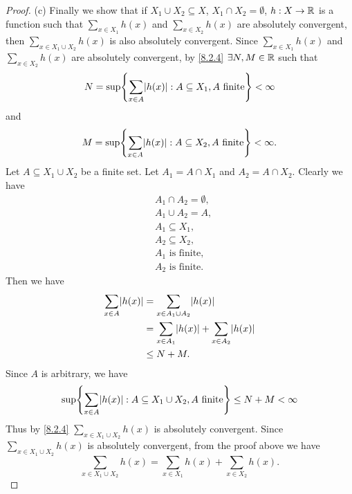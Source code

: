 \begin{proof}{(c)}
  Finally we show that if \(X_1 \cup X_2 \subseteq X\), \(X_1 \cap X_2 = \emptyset\), \(h : X \to \mathbb{R}\) is a function such that \(\sum_{x \in X_1} h(x)\) and \(\sum_{x \in X_2} h(x)\) are absolutely convergent, then \(\sum_{x \in X_1 \cup X_2} h(x)\) is also absolutely convergent.
  Since \(\sum_{x \in X_1} h(x)\) and \(\sum_{x \in X_2} h(x)\) are absolutely convergent, by \cref{8.2.4} \(\exists N, M \in \mathbb{R}\) such that
  \[
    N = \sup\set{\sum_{x \in A} \abs{h(x)} : A \subseteq X_1, A \text{ finite}} < \infty
  \]
  and
  \[
    M = \sup\set{\sum_{x \in A} \abs{h(x)} : A \subseteq X_2, A \text{ finite}} < \infty.
  \]
  Let \(A \subseteq X_1 \cup X_2\) be a finite set.
  Let \(A_1 = A \cap X_1\) and \(A_2 = A \cap X_2\).
  Clearly we have
  \begin{align*}
     & A_1 \cap A_2 = \emptyset, \\
     & A_1 \cup A_2 = A,         \\
     & A_1 \subseteq X_1,        \\
     & A_2 \subseteq X_2,        \\
     & A_1 \text{ is finite},    \\
     & A_2 \text{ is finite}.
  \end{align*}
  Then we have
  \begin{align*}
    \sum_{x \in A} \abs{h(x)} & = \sum_{x \in A_1 \cup A_2} \abs{h(x)}                      \\
                              & = \sum_{x \in A_1} \abs{h(x)} + \sum_{x \in A_2} \abs{h(x)} \\
                              & \leq N + M.
  \end{align*}
  Since \(A\) is arbitrary, we have
  \[
    \sup\set{\sum_{x \in A} \abs{h(x)} : A \subseteq X_1 \cup X_2, A \text{ finite}} \leq N + M < \infty
  \]
  Thus by \cref{8.2.4} \(\sum_{x \in X_1 \cup X_2} h(x)\) is absolutely convergent.
  Since \(\sum_{x \in X_1 \cup X_2} h(x)\) is absolutely convergent, from the proof above we have
  \[
    \sum_{x \in X_1 \cup X_2} h(x) = \sum_{x \in X_1} h(x) + \sum_{x \in X_2} h(x).
  \]
\end{proof}

